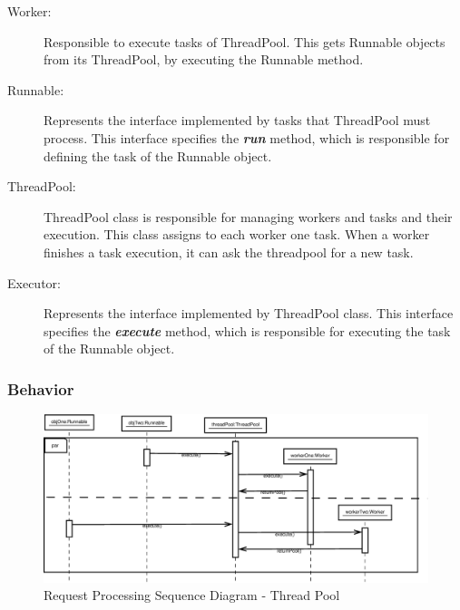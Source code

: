 \begin{description}
	\item[Worker:]
	Responsible to execute tasks of ThreadPool. This gets Runnable objects from its ThreadPool, by executing the Runnable method.
	
	\item[Runnable:]
	Represents the interface implemented by tasks that ThreadPool must process. This interface specifies the \textbf{\textit{run }}method, which is responsible for defining the task of the Runnable object.
	
	\item[ThreadPool:]
	ThreadPool class is responsible for managing workers and tasks and their execution. This class assigns to each worker one task. When a worker finishes a task execution, it can ask the threadpool for a new task. 
	
	\item[Executor:]
	Represents the interface implemented by ThreadPool class. This interface specifies the \textbf{\textit{execute }}method, which is responsible for executing the task of the Runnable object.
	
\end{description}

\subsubsection{Behavior}


\begin{figure}
	\centering
	\includegraphics*[width=1\textwidth, keepaspectratio=false]{fig/image30.eps}
	\caption{Request Processing Sequence Diagram - Thread Pool}
	\label{fig:seq_diagram_tp2}
\end{figure}


